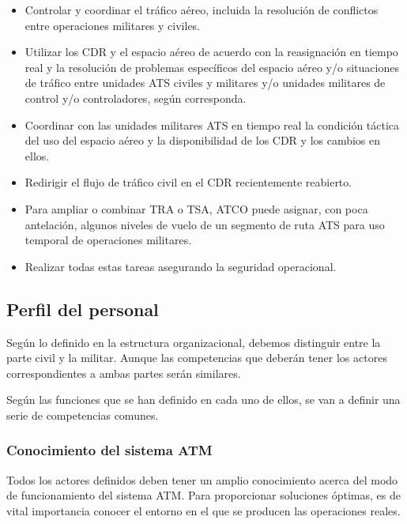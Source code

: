 \begin{itemize}
    \item Controlar y coordinar el tráfico aéreo, incluida la resolución de conflictos entre operaciones militares y civiles.
    
    \item Utilizar los CDR y el espacio aéreo de acuerdo con la reasignación en tiempo real y la resolución de problemas específicos del espacio aéreo y/o situaciones de tráfico entre unidades ATS civiles y militares y/o unidades militares de control y/o controladores, según corresponda.
    
    \item Coordinar con las unidades militares ATS en tiempo real la condición táctica del uso del espacio aéreo y la disponibilidad de los CDR y los cambios en ellos.
    
    \item Redirigir el flujo de tráfico civil en el CDR recientemente reabierto.
    
    \item Para ampliar o combinar TRA o TSA, ATCO puede asignar, con poca antelación, algunos niveles de vuelo de un segmento de ruta ATS para uso temporal de operaciones militares.
    
    \item Realizar todas estas tareas asegurando la seguridad operacional.
\end{itemize}

\subsection{Perfil del personal}

Según lo definido en la estructura organizacional, debemos distinguir entre la parte civil y la militar. Aunque las competencias que deberán tener los actores correspondientes a ambas partes serán similares.

Según las funciones que se han definido en cada uno de ellos, se van a definir una serie de competencias comunes.

\subsubsection{Conocimiento del sistema ATM}

Todos los actores definidos deben tener un amplio conocimiento acerca del modo de funcionamiento del sistema ATM. Para proporcionar soluciones óptimas, es de vital importancia conocer el entorno en el que se producen las operaciones reales.

